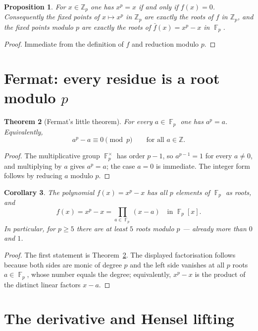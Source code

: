 \documentclass[11pt]{article}
\newtheorem{theorem}{Theorem}
\newtheorem{proposition}[theorem]{Proposition}
\newtheorem{corollary}[theorem]{Corollary}
\theoremstyle{definition}
\DeclareMathOperator{\F}{\mathbb{F}}
\newcommand{\Zp}{\mathbb{Z}_p}
\newcommand{\Z}{\mathbb{Z}}
\begin{document}
\begin{proposition}\label{prop:roots}
For $x\in\Zp$ one has $x^{p}=x$ if and only if $f(x)=0$. Consequently the fixed
points of $x\mapsto x^{p}$ in $\Zp$ are exactly the roots of $f$ in $\Zp$, and the
fixed points modulo $p$ are exactly the roots of $\bar f(x)=x^{p}-x$ in $\F_p$.
\end{proposition}

\begin{proof}
Immediate from the definition of $f$ and reduction modulo $p$.
\end{proof}

\section{Fermat: every residue is a root modulo $p$}

\begin{theorem}[Fermat's little theorem]\label{thm:fermat}
For every $a\in\F_p$ one has $a^{p}=a$. Equivalently,
\[
  a^{p}-a\equiv 0 \pmod p \qquad\text{for all } a\in\Z .
\]
\end{theorem}

\begin{proof}
The multiplicative group $\F_p^{\times}$ has order $p-1$, so $a^{p-1}=1$ for
every $a\ne 0$, and multiplying by $a$ gives $a^{p}=a$; the case $a=0$ is
immediate. The integer form follows by reducing $a$ modulo $p$.
\end{proof}

\begin{corollary}\label{cor:allres}
The polynomial $f(x)=x^{p}-x$ has all $p$ elements of $\F_p$ as roots, and
\[
  f(x)=x^{p}-x=\prod_{a\in\F_p}(x-a) \quad\text{in }\F_p[x].
\]
In particular, for $p\ge 5$ there are at least $5$ roots modulo $p$ --- already
more than $0$ and $1$.
\end{corollary}

\begin{proof}
The first statement is Theorem~\ref{thm:fermat}. The displayed factorisation
follows because both sides are monic of degree $p$ and the left side vanishes at
all $p$ roots $a\in\F_p$, whose number equals the degree; equivalently, $x^{p}-x$
is the product of the distinct linear factors $x-a$.
\end{proof}

\section{The derivative and Hensel lifting}
\end{document}
